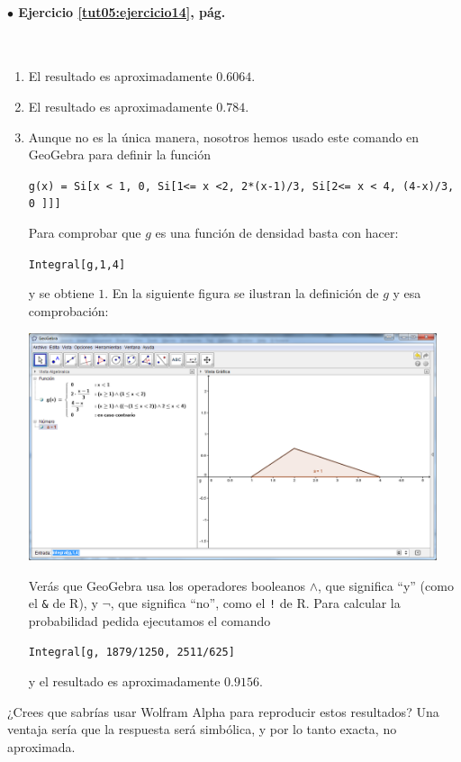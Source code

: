 \documentclass[10pt,a4paper]{article}\usepackage[]{graphicx}\usepackage[]{color}
\begin{document}
\paragraph{\bf $\bullet$ Ejercicio \ref{tut05:ejercicio14}, pág. \pageref{tut05:ejercicio14}}
\label{tut05:ejercicio14:sol}\quad\\

\begin{enumerate}
  \item El resultado es aproximadamente $0.6064$.
  \item El resultado es aproximadamente $0.784$.
  \item Aunque no es la única manera, nosotros hemos usado este comando en GeoGebra para definir la función
  \begin{center}
  \verb#g(x) = Si[x < 1, 0, Si[1<= x <2, 2*(x-1)/3, Si[2<= x < 4, (4-x)/3, 0 ]]]#
  \end{center}
  Para comprobar que $g$ es una función de densidad basta con hacer:
  \begin{center}
    {\tt Integral[g,1,4]}
  \end{center}
  y se obtiene $1$. En la siguiente figura se ilustran la definición de $g$ y esa comprobación:
    \begin{center}
        \includegraphics[width=12cm]{../fig/Tut05-58.png}
    \end{center}
  Verás que GeoGebra usa los operadores booleanos {$\wedge$}, que significa ``y'' (como el \verb#&# de R), y {$\neg$}, que significa ``no'', como el {\tt !} de R. Para calcular la probabilidad pedida ejecutamos el comando
  \begin{center}
    {\tt Integral[g, 1879/1250, 2511/625]}
  \end{center}
  y el resultado es aproximadamente $0.9156$.
\end{enumerate}
¿Crees que sabrías usar Wolfram Alpha para reproducir estos resultados? Una ventaja sería que la respuesta será simbólica, y por lo tanto exacta, no aproximada.
\end{document}

